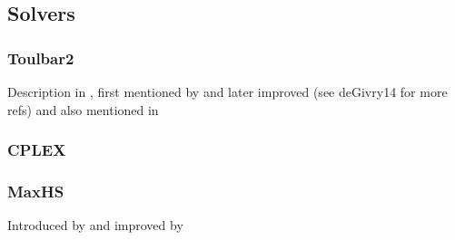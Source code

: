 \subsection{Solvers}


\subsubsection{Toulbar2}
Description in \parencite{Allouche10}, first mentioned by \textcite{deGivry05} and later improved (see deGivry14 for more refs) and also mentioned in \parencite{Sanchez08}

\subsubsection{CPLEX}

\subsubsection{MaxHS}
Introduced by \textcite{Davies11} and improved by \parencite{Davies13}
